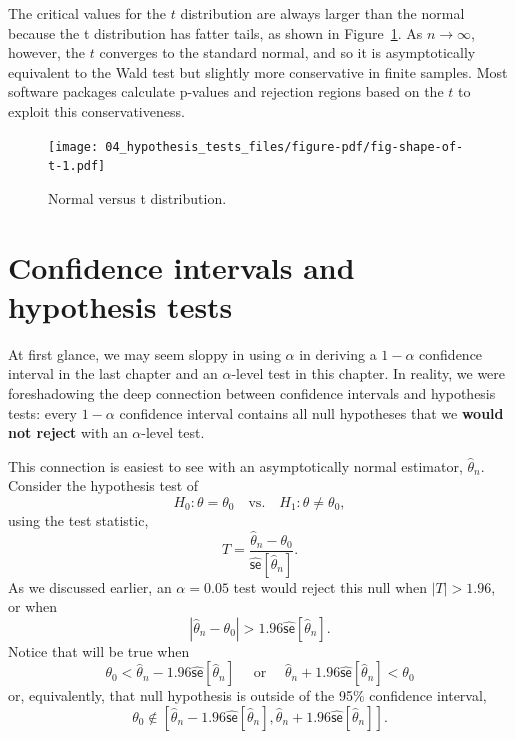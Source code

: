\documentclass[
  letterpaper,
  DIV=11,
  numbers=noendperiod]{scrreprt}
\newcommand{\se}{\textsf{se}}
\theoremstyle{plain}
\theoremstyle{definition}
\theoremstyle{definition}
\theoremstyle{remark}
\begin{document}
The critical values for the \(t\) distribution are always larger than
the normal because the t distribution has fatter tails, as shown in
Figure~\ref{fig-shape-of-t}. As \(n\to\infty\), however, the \(t\)
converges to the standard normal, and so it is asymptotically equivalent
to the Wald test but slightly more conservative in finite samples. Most
software packages calculate p-values and rejection regions based on the
\(t\) to exploit this conservativeness.

\begin{figure}[th]

{\centering \texttt{[image: 04\_hypothesis\_tests\_files/figure-pdf/fig-shape-of-t-1.pdf]}

}

\caption{\label{fig-shape-of-t}Normal versus t distribution.}

\end{figure}

\hypertarget{confidence-intervals-and-hypothesis-tests}{%
\section{Confidence intervals and hypothesis
tests}\label{confidence-intervals-and-hypothesis-tests}}

At first glance, we may seem sloppy in using \(\alpha\) in deriving a
\(1 - \alpha\) confidence interval in the last chapter and an
\(\alpha\)-level test in this chapter. In reality, we were foreshadowing
the deep connection between confidence intervals and hypothesis tests:
every \(1-\alpha\) confidence interval contains all null hypotheses that
we \textbf{would not reject} with an \(\alpha\)-level test.

This connection is easiest to see with an asymptotically normal
estimator, \(\widehat{\theta}_n\). Consider the hypothesis test of \[ 
H_0: \theta = \theta_0 \quad \text{vs.}\quad H_1: \theta \neq \theta_0,
\] using the test statistic, \[ 
T = \frac{\widehat{\theta}_{n} - \theta_{0}}{\widehat{\se}[\widehat{\theta}_{n}]}. 
\] As we discussed earlier, an \(\alpha = 0.05\) test would reject this
null when \(|T| > 1.96\), or when \[ 
|\widehat{\theta}_{n} - \theta_{0}| > 1.96 \widehat{\se}[\widehat{\theta}_{n}]. 
\] Notice that will be true when \[ 
\theta_{0} < \widehat{\theta}_{n} - 1.96\widehat{\se}[\widehat{\theta}_{n}]\quad \text{ or }\quad \widehat{\theta}_{n} + 1.96\widehat{\se}[\widehat{\theta}_{n}] < \theta_{0}
\] or, equivalently, that null hypothesis is outside of the 95\%
confidence interval,
\[\theta_0 \notin \left[\widehat{\theta}_{n} - 1.96\widehat{\se}[\widehat{\theta}_{n}], \widehat{\theta}_{n} + 1.96\widehat{\se}[\widehat{\theta}_{n}]\right].\]
\end{document}
